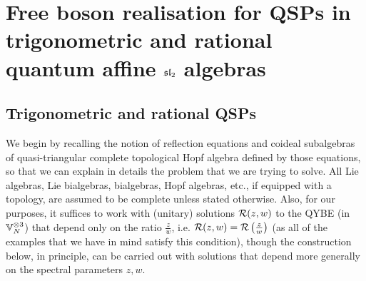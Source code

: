 \section{\texorpdfstring{Free boson realisation for QSPs in trigonometric and rational quantum affine $\sl_2$ algebras}{}}
    \subsection{\texorpdfstring{Trigonometric and rational QSPs}{}}
    
        We begin by recalling the notion of reflection equations and coideal subalgebras of quasi-triangular complete topological Hopf algebra defined by those equations, so that we can explain in details the problem that we are trying to solve. All Lie algebras, Lie bialgebras, bialgebras, Hopf algebras, etc., if equipped with a topology, are assumed to be complete unless stated otherwise. Also, for our purposes, it suffices to work with (unitary) solutions $\calR(z, w)$ to the QYBE (in $\bbV_N^{\tensor 3}$) that depend only on the ratio $\frac{z}{w}$, i.e. $\calR(z, w) = \calR\left(\frac{z}{w}\right)$ (as all of the examples that we have in mind satisfy this condition), though the construction below, in principle, can be carried out with solutions that depend more generally on the spectral parameters $z, w$.
        
